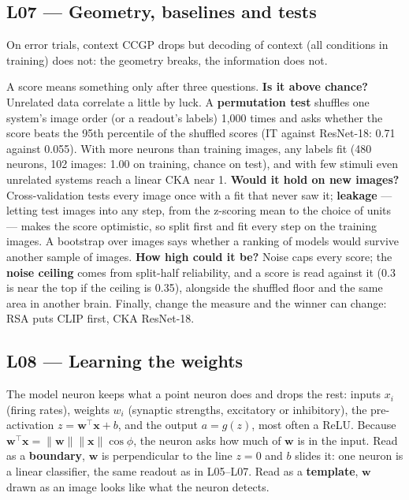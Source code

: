\documentclass[11pt]{article}
\begin{document}
\subsection{L07 --- Geometry, baselines and tests}

On error trials, context CCGP drops but decoding of context (all conditions in
training) does not: the geometry breaks, the information does not.

A score means something only after three questions. \textbf{Is it above
chance?} Unrelated data correlate a little by luck. A \textbf{permutation test}
shuffles one system's image order (or a readout's labels) 1,000 times and asks
whether the score beats the 95th percentile of the shuffled scores (IT against
ResNet-18: 0.71 against 0.055). With more neurons than training images, any
labels fit (480 neurons, 102 images: 1.00 on training, chance on test), and with
few stimuli even unrelated systems reach a linear CKA near 1. \textbf{Would it
hold on new images?} Cross-validation tests every image once with a fit that
never saw it; \textbf{leakage} --- letting test images into any step, from the
z-scoring mean to the choice of units --- makes the score optimistic, so split
first and fit every step on the training images. A bootstrap over images says
whether a ranking of models would survive another sample of images.
\textbf{How high could it be?} Noise caps every score; the \textbf{noise
ceiling} comes from split-half reliability, and a score is read against it (0.3
is near the top if the ceiling is 0.35), alongside the shuffled floor and the
same area in another brain. Finally, change the measure and the winner can
change: RSA puts CLIP first, CKA ResNet-18.

\subsection{L08 --- Learning the weights}

The model neuron keeps what a point neuron does and drops the rest: inputs
$x_i$ (firing rates), weights $w_i$ (synaptic strengths, excitatory or
inhibitory), the pre-activation $z=\mathbf{w}^\top\mathbf{x}+b$, and the output
$a=g(z)$, most often a ReLU. Because
$\mathbf{w}^\top\mathbf{x}=\|\mathbf{w}\|\|\mathbf{x}\|\cos\phi$, the neuron
asks how much of $\mathbf{w}$ is in the input. Read as a \textbf{boundary},
$\mathbf{w}$ is perpendicular to the line $z=0$ and $b$ slides it: one neuron is
a linear classifier, the same readout as in L05--L07. Read as a
\textbf{template}, $\mathbf{w}$ drawn as an image looks like what the neuron
detects.
\end{document}

